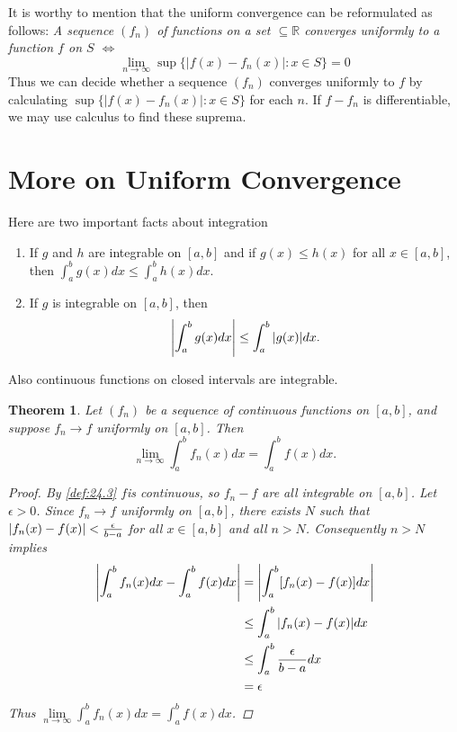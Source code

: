 \documentclass[12pt, lettersize]{book}
\newtheorem{thm}{Theorem}[section]
\newcommand{\R}{\mathbb{R}}
\begin{document}
	It is worthy to mention that the uniform convergence can be reformulated as follows: \emph{A sequence $(f_n)$ of functions on a set $\subseteq\R$ converges uniformly to a function $f$ on $S$ $\iff$}
	\begin{displaymath}
		\lim\limits_{n\rightarrow\infty}\sup\{|f(x)-f_n(x)|: x\in S\}=0
	\end{displaymath}
	Thus we can decide whether a sequence $(f_n)$ converges uniformly to $f$ by calculating $\sup\{|f(x)-f_n(x)|: x\in S\}$ for each $n$. If $f-f_n$ is differentiable, we may use calculus to find these suprema.
	\newpage
	\section{More on Uniform Convergence}
	Here are two important facts about integration
	\begin{enumerate}
		\item If $g$ and $h$ are integrable on $[a,b]$ and if $g(x)\leq h(x)$ for all $x\in[a,b]$, then $\int_{a}^{b}g(x)dx\leq\int_{a}^{b}h(x)dx$.
		\item If $g$ is integrable on $[a,b]$, then
		\begin{displaymath}
			\abs{\int_{a}^{b}g(x)dx}\leq\int_{a}^{b}\abs{g(x)}dx.
		\end{displaymath}
	\end{enumerate}
	Also continuous functions on closed intervals are integrable.
	
	\begin{thm}\label{thm:25.2}
		Let $(f_n)$ be a sequence of continuous functions on $[a,b]$, and suppose $f_n\rightarrow f$ uniformly on $[a,b]$. Then
		\begin{displaymath}
			\lim\limits_{n\rightarrow\infty}\int_{a}^{b}f_n(x)dx=\int_{a}^{b}f(x)dx.
		\end{displaymath}
		\begin{proof}
			By \ref{def:24.3} $f$is continuous, so $f_n-f$ are all integrable on $[a,b]$. Let $\epsilon>0$. Since $f_n\rightarrow f$ uniformly on $[a,b]$, there exists $N$ such that $\abs{f_n(x)-f(x)}<\frac{\epsilon}{b-a}$ for all $x\in[a,b]$ and all $n>N$. Consequently $n>N$ implies
			\begin{align*}
				\abs{\int_{a}^{b}f_n(x)dx-\int_{a}^{b}f(x)dx}&=\abs{\int_{a}^{b}[f_n(x)-f(x)]dx}\\
				&\leq\int_{a}^{b}\abs{f_n(x)-f(x)}dx\\
				&\leq\int_{a}^{b}\frac{\epsilon}{b-a}dx\\
				&=\epsilon
			\end{align*}
			Thus $\lim\limits_{n\rightarrow\infty}\int_{a}^{b}f_n(x)dx=\int_{a}^{b}f(x)dx$.
		\end{proof}
	\end{thm}
	
\end{document}
